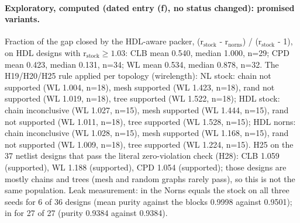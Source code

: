 \paragraph{Exploratory, computed (dated entry (f), no status changed): promised variants.} Fraction of the gap closed by the HDL-aware packer, (r$_{\mathrm{stock}}$ - r$_{\mathrm{norns}}$) / (r$_{\mathrm{stock}}$ - 1), on HDL designs with r$_{\mathrm{stock}}\ge1.03$: CLB mean 0.540, median 1.000, n=29; CPD mean 0.423, median 0.131, n=34; WL mean 0.534, median 0.878, n=32. The H19/H20/H25 rule applied per topology (wirelength): NL stock: chain not supported (WL 1.004, n=18), mesh supported (WL 1.423, n=18), rand not supported (WL 1.019, n=18), tree supported (WL 1.522, n=18); HDL stock: chain inconclusive (WL 1.027, n=15), mesh supported (WL 1.444, n=15), rand not supported (WL 1.011, n=18), tree supported (WL 1.528, n=15); HDL norns: chain inconclusive (WL 1.028, n=15), mesh supported (WL 1.168, n=15), rand not supported (WL 1.009, n=18), tree supported (WL 1.224, n=15). H25 on the 37 netlist designs that pass the literal zero-violation check (H28): CLB 1.059 (supported), WL 1.188 (supported), CPD 1.054 (supported); those designs are mostly chains and trees (mesh and random graphs rarely pass), so this is not the same population. Leak measurement: in  the Norns  equals the stock  on all three seeds for 6 of 36 designs (mean purity against the blocks 0.9998 against 0.9501); in  for 27 of 27 (purity 0.9384 against 0.9384).

